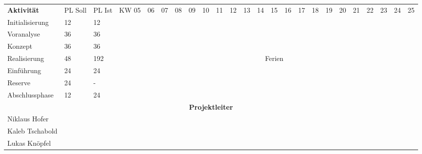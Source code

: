 \documentclass[10pt,paper=a4,final]{scrartcl}
\begin{document}
\begin{landscape}
\begin{tabularx}{\textwidth}{ |p{4.0cm}|l|l|l|l|l|l|l|l|l|l|l|l|l|l|l|l|l|l|l|l|l|l|l| }
\cline{1-24}	%
\bf Aktivit\"at & PL Soll & PL Ist & KW 05 & 06 & 07 & 08 & 09 & 10 & 11 & 12 & 13 & 14 & 15 & 16 & 17 & 18 & 19 & 20 & 21 & 22 & 23 & 24 & 25 \\
\cline{1-24}
Initialisierung & 12 & 12 & & \cellcolor[gray]{0.7} & & & & & & & & & & & & & & & & & & & \\
\cline{1-24}
Voranalyse & 36 & 36 & & & \cellcolor[gray]{0.7} & \cellcolor[gray]{0.7} & \cellcolor[gray]{0.7} & & & & & & & & & & & & & & & & \\
\cline{1-24}
Konzept & 36 & 36 & & & & & & \cellcolor[gray]{0.7} & \cellcolor[gray]{0.7} & \cellcolor[gray]{0.7} & & & & & & & & & & & & & \\
\cline{1-24}
Realisierung & 48 & 192 \cellcolor{red!100!} & & & & & & & & & \cellcolor[gray]{0.7} & \multicolumn{3}{|c|}{Ferien \cellcolor{green!70!}} & \cellcolor[gray]{0.7} & \cellcolor[gray]{0.7} & \cellcolor[gray]{0.7} & & & & & & \\
\cline{1-24}
Einf\"uhrung & 24 & 24 & & & & & & & & & & & & & & & & \cellcolor[gray]{0.7} & \cellcolor[gray]{0.7} & & & & \\
\cline{1-24}
Reserve & 24 & - & & & & & & & & & & & & & & & & & & \cellcolor[gray]{0.7} & \cellcolor[gray]{0.7} & & \\
\cline{1-24}
Abschlussphase & 12 & 24 \cellcolor{red!100!} & & & & & & & & & & & & & & & & & & & & \cellcolor[gray]{0.7} & \cellcolor[gray]{0.7}\\
\cline{1-24}
\multicolumn{24}{|c|}{\bf Projektleiter} \\
\cline{1-24}
Niklaus Hofer & & & \cellcolor[gray]{0.7} & \cellcolor[gray]{0.7} & \cellcolor[gray]{0.7} & \cellcolor[gray]{0.7} & \cellcolor[gray]{0.7} & & & & & & & & & & & & & & & & \\
\cline{1-24}
Kaleb Tschabold & & & & & & & & \cellcolor[gray]{0.7} & \cellcolor[gray]{0.7} & \cellcolor[gray]{0.7} & \cellcolor[gray]{0.7} & \cellcolor[gray]{0.7} & \cellcolor[gray]{0.7} & \cellcolor[gray]{0.7} & \cellcolor[gray]{0.7} & & & & & & & & \\
\cline{1-24}
Lukas Kn\"opfel & & & & & & & & & & & & & & & & \cellcolor[gray]{0.7} & \cellcolor[gray]{0.7} & \cellcolor[gray]{0.7} & \cellcolor[gray]{0.7} & \cellcolor[gray]{0.7} & \cellcolor[gray]{0.7} & \cellcolor[gray]{0.7} & \cellcolor[gray]{0.7}\\
\cline{1-24}
\end{tabularx}
\end{landscape}
\newpage
\end{document}
